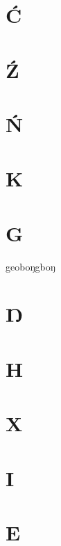 \begin{multicols*}{2}
\section{Ć}

\section{Ź}

\section{Ń}

\section{K}

\section{G}


\begin{description}[leftmargin=*]
    \begin{dictentry}{geoboŋ}{g\unro boŋ}
    \end{dictentry}
\end{description}


\section{Ŋ}

\section{H}

\section{X}

\section{I}

\section{E}


\end{multicols*}
